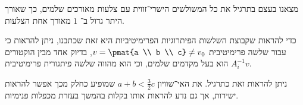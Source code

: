 \documentclass[a4paper,10pt,twoside,openany]{article}
\begin{document}
\begin{remark}
מצאנו בעצם בתרגיל את כל המשולשים הישרי־זווית עם צלעות מאורכים שלמים, כך שאורך היתר גדול ב־%
$1$
מאורך אחת הצלעות.
\end{remark}

\begin{remark}
כדי להראות שקבוצת השלשות הפיתרוגיות הפרימיטיביות היא זאת שכתבנו, ניתן להראות כי עבור שלשה פרימיטיבית
$v = \pmat{a \\ b \\ c} \neq v_0$,
בדיוק אחד מבין הוקטורים
$A_i^{-1} v$
הוא בעל מקדמים שלמים, וכי הוא מהווה שלשה פיתגורית פרימיטיבית.

ניתן להראות זאת כתרגיל. את האי־שוויון $a+b < \frac{3}{2}c$ שמופיע כחלק מכך אפשר להראות ישירות, אך גם נדע להראות אותו בקלות בהמשך בעזרת מכפלות פנימיות.
\end{remark}
\end{document}

